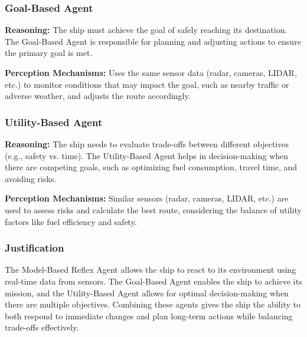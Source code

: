 \documentclass{article}
\begin{document}
\subsubsection{Goal-Based Agent}
\textbf{Reasoning:} The ship must achieve the goal of safely reaching its destination. The Goal-Based Agent is responsible for planning and adjusting actions to ensure the primary goal is met.

\textbf{Perception Mechanisms:} Uses the same sensor data (radar, cameras, LIDAR, etc.) to monitor conditions that may impact the goal, such as nearby traffic or adverse weather, and adjusts the route accordingly.

\subsubsection{Utility-Based Agent}
\textbf{Reasoning:} The ship needs to evaluate trade-offs between different objectives (e.g., safety vs. time). The Utility-Based Agent helps in decision-making when there are competing goals, such as optimizing fuel consumption, travel time, and avoiding risks.

\textbf{Perception Mechanisms:} Similar sensors (radar, cameras, LIDAR, etc.) are used to assess risks and calculate the best route, considering the balance of utility factors like fuel efficiency and safety.

\subsubsection{Justification}
The Model-Based Reflex Agent allows the ship to react to its environment using real-time data from sensors. The Goal-Based Agent enables the ship to achieve its mission, and the Utility-Based Agent allows for optimal decision-making when there are multiple objectives. Combining these agents gives the ship the ability to both respond to immediate changes and plan long-term actions while balancing trade-offs effectively.
\end{document}

